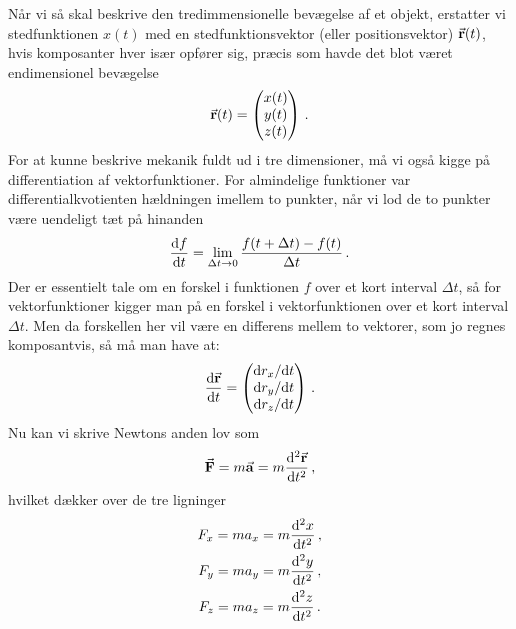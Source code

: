 Når vi så skal beskrive den tredimmensionelle bevægelse af et objekt, erstatter vi stedfunktionen $x(t)$ med en stedfunktionsvektor (eller positionsvektor) $\va r(t)$, hvis komposanter hver især opfører sig, præcis som havde det blot været endimensionel bevægelse
\begin{equation}
    \va r(t)=\begin{pmatrix}
    x(t)\\y(t)\\z(t)
    \end{pmatrix} \, .
\end{equation}
For at kunne beskrive mekanik fuldt ud i tre dimensioner, må vi også kigge på differentiation af vektorfunktioner.
For almindelige funktioner var differentialkvotienten hældningen imellem to punkter, når vi lod de to punkter være uendeligt tæt på hinanden
$$
\dv{f}{t}=\lim_{\Delta t\rightarrow 0}\frac{ f(t+\Delta t)- f(t)}{\Delta t} \, .
$$
Der er essentielt tale om en forskel i funktionen $f$ over et kort interval $\Delta t$, så for vektorfunktioner kigger man på en forskel i vektorfunktionen over et kort interval $\Delta t$. Men da forskellen her vil være en differens mellem to vektorer, som jo regnes komposantvis, så må man have at:
\begin{equation}
    \dv{\va r}{t}=\begin{pmatrix} \dd r_x/\dd t\\\dd r_y/\dd t\\\dd r_z/\dd t\end{pmatrix} \, .
\end{equation} 
Nu kan vi skrive Newtons anden lov som
$$
\va F= m\va a=m\dv[2]{\va r}{t} \, ,
$$
hvilket dækker over de tre ligninger
\begin{gather*}
    F_x=ma_x=m\dv[2]{x}{t} \, ,\\
    F_y=ma_y=m\dv[2]{y}{t} \, ,\\
    F_z=ma_z=m\dv[2]{z}{t} \, .
\end{gather*}